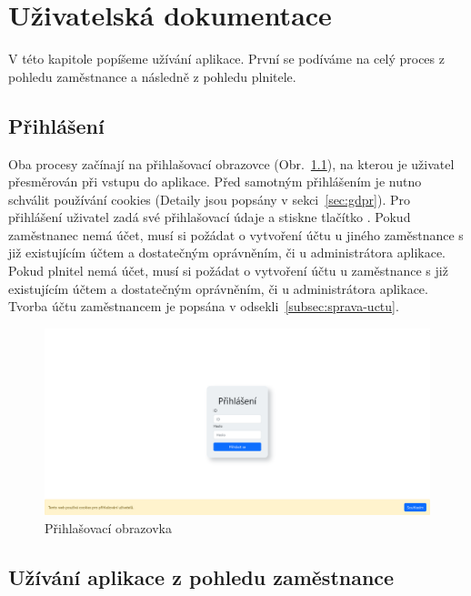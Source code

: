 \chapter{Uživatelská dokumentace}\label{ch:uzivatelska-dokumentace}

V této kapitole popíšeme užívání aplikace.
První se podíváme na celý proces z pohledu zaměstnance a následně z pohledu plnitele.


\section{Přihlášení}\label{sec:prihlaseni}

Oba procesy začínají na přihlašovací obrazovce (Obr.\ \ref{fig:login-screenshot}), na kterou je uživatel přesměrován při vstupu do aplikace.
Před samotným přihlášením je nutno schválit používání cookies (Detaily jsou popsány v sekci~\ref{sec:gdpr}).
Pro přihlášení uživatel zadá své přihlašovací údaje a stiskne tlačítko .
Pokud zaměstnanec nemá účet, musí si požádat o vytvoření účtu u jiného zaměstnance s již existujícím účtem a dostatečným oprávněním, či u administrátora aplikace.
Pokud plnitel nemá účet, musí si požádat o vytvoření účtu u zaměstnance s již existujícím účtem a dostatečným oprávněním, či u administrátora aplikace.
Tvorba účtu zaměstnancem je popsána v odsekli~\ref{subsec:sprava-uctu}.

\begin{figure}[H]
    \includegraphics[width=\textwidth]{../img/screenshots/login}
    \caption{Přihlašovací obrazovka}\label{fig:login-screenshot}
\end{figure}


\section{Užívání aplikace z pohledu zaměstnance}\label{sec:uzivani-aplikace-z-pohledu-zamestnance}

